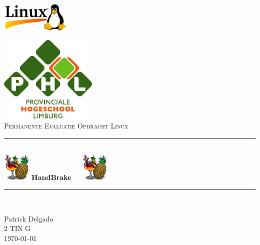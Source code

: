 \documentclass[openbib, 12pt]{article}
\newcommand{\HRule}{\rule{\linewidth}{0.7mm}}
\begin{document}
\begin{titlepage}
\begin{center}
\begin{flushright}
\includegraphics[width=0.25\textwidth]{linux-logo.jpg}\\[1cm]
\end{flushright}

\includegraphics[width=0.35\textwidth]{phl-logo.jpg}\\[1.5cm]


\textsc{\LARGE Permanente Evaluatie Opdracht Linux}\\[0.5cm]

\HRule \\[0.5cm]
\includegraphics[width=0.10\textwidth]{Handbrake-logo.png} { \huge \bfseries \textbf{ HandBrake}}\ \ \  \includegraphics[width=0.10\textwidth]{Handbrake-logo.png}\\[0.4cm]
\HRule \\[1.5cm]

\vfill

\begin{flushright}
\Large {Patrick Delgado\\
2 TIN G\\
\today}

\end{flushright}

\end{center}
\end{titlepage}


\tableofcontents
\newpage

\listoffigures
\newpage
\listoftables
\newpage


\shadowsectionbox







\newpage


\newpage

\newpage

\newpage
\printindex
\end{document}

